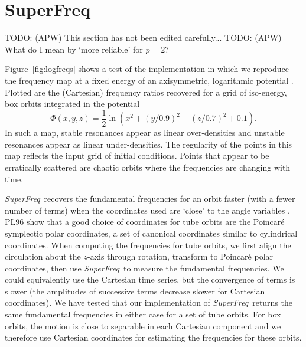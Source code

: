\documentclass[letterpaper,12pt,preprint]{aastex}
\newcommand{\project}[1]{\textsl{#1}}
\newcommand{\superfreq}{\project{SuperFreq}}
\newcommand{\todo}[2]{{\color{red} TODO: (\MakeUppercase{#1}) #2}}
\begin{document}
\section{SuperFreq}\label{sec:naffapdx}

\todo{apw}{This section has not been edited carefully...}
\todo{apw}{What do I mean by `more reliable' for $p=2$?}

Figure~\ref{fig:logfreqs} shows a test of the implementation in which we reproduce the frequency map at a fixed energy of an axisymmetric, logarithmic potential \cite[][pg. 260, Figure~3.45]{binneytremaine}. Plotted are the (Cartesian) frequency ratios recovered for a grid of iso-energy, box orbits integrated in the potential
\begin{equation}
	\Phi(x,y,z) = \frac{1}{2}\ln\left(x^2 + (y/0.9)^2 + (z/0.7)^2 + 0.1\right). \label{eq:logpotential}
\end{equation}
In such a map, stable resonances appear as linear over-densities and unstable resonances appear as linear under-densities. The regularity of the points in this map reflects the input grid of initial conditions. Points that appear to be erratically scattered are chaotic orbits where the frequencies are changing with time.

\superfreq\ recovers the fundamental frequencies for an orbit faster (with a fewer number of terms) when the coordinates used are `close' to the angle variables \cite[PL96;][]{papaphilippou96}. PL96 show that a good choice of coordinates for tube orbits are the Poincar\'e symplectic polar coordinates, a set of canonical coordinates similar to cylindrical coordinates. When computing the frequencies for tube orbits, we first align the circulation about the $z$-axis through rotation, transform to Poincar\'e polar coordinates, then use \superfreq\ to measure the fundamental frequencies. We could equivalently use the Cartesian time series, but the convergence of terms is slower (the amplitudes of successive terms decrease slower for Cartesian coordinates). We have tested that our implementation of \superfreq\ returns the same fundamental frequencies in either case for a set of tube orbits. For box orbits, the motion is close to separable in each Cartesian component and we therefore use Cartesian coordinates for estimating the frequencies for these orbits. 
\end{document}
